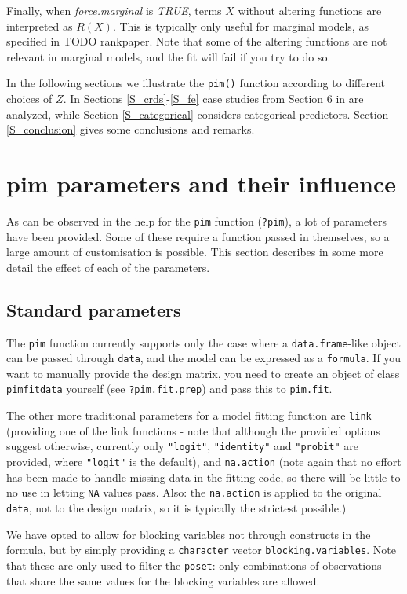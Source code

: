 \documentclass[12pt]{article}
\newcommand{\pim}[1]{\texttt{#1}}%
\newcommand{\cd}[1]{\texttt{#1}}%
\begin{document}
Finally, when \emph{force.marginal} is \emph{TRUE}, terms $X$ without altering functions are interpreted as $R(X)$. This is typically only useful for marginal models, as specified in TODO rankpaper. Note that some of the altering functions are not relevant in marginal models, and the fit will fail if you try to do so.

In the following sections we illustrate the \texttt{pim()} function according to different choices of $Z$. In Sections \ref{S_crds}-\ref{S_fe} case studies from Section 6 in \cite{Thas2012} are analyzed, while Section \ref{S_categorical} considers categorical predictors. Section \ref{S_conclusion} gives some conclusions and remarks.  


\section{pim parameters and their influence}\label{S_parms}
As can be observed in the help for the \pim{pim} function (\cd{?pim}), a lot of parameters have been provided. Some of these require a function passed in themselves, so a large amount of customisation is possible. This section describes in some more detail the effect of each of the parameters.
\subsection{Standard parameters}\label{SS_spar}
The \pim{pim} function currently supports only the case where a \cd{data.frame}-like object can be passed through \cd{data}, and the model can be expressed as a \cd{formula}. If you want to manually provide the design matrix, you need to create an object of class \cd{pimfitdata} yourself (see \cd{?pim.fit.prep}) and pass this to \pim{pim.fit}.

The other more traditional parameters for a model fitting function are \cd{link} (providing one of the link functions - note that although the provided options suggest otherwise, currently only \cd{"logit"}, \cd{"identity"} and \cd{"probit"} are provided, where \cd{"logit"} is the default), and \cd{na.action} (note again that no effort has been made to handle missing data in the fitting code, so there will be little to no use in letting \cd{NA} values pass. Also: the \cd{na.action} is applied to the original \cd{data}, not to the design matrix, so it is typically the strictest possible.)

We have opted to allow for blocking variables not through constructs in the formula, but by simply providing a \cd{character} vector \cd{blocking.variables}. Note that these are only used to filter the \cd{poset}: only combinations of observations that share the same values for the blocking variables are allowed.
\end{document}
